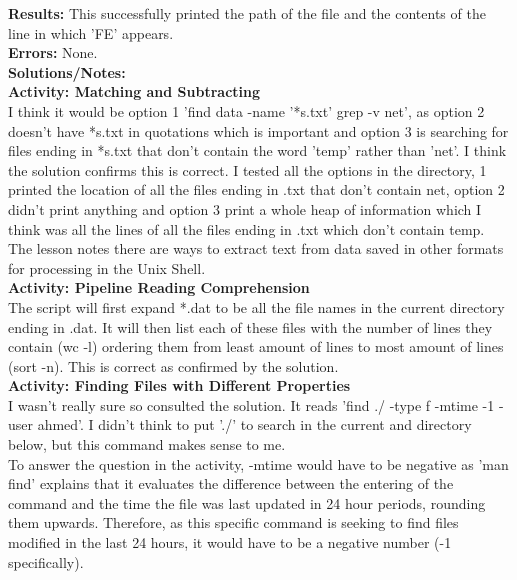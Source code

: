\documentclass{article}
\begin{document}
\begin{FlushLeft}
\textbf{Results:} This successfully printed the path of the file and the contents of the line in which 'FE' appears. \\
\textbf{Errors:} None.\\
\textbf{Solutions/Notes:}\\
\vspace{5mm}
\textbf{Activity: Matching and Subtracting} \\
I think it would be option 1 'find data -name '*s.txt' \textbar{} grep -v net', as option 2 doesn't have *s.txt in quotations which is important and option 3 is searching for files ending in *s.txt that don't contain the word 'temp' rather than 'net'. I think the solution confirms this is correct. I tested all the options in the directory, 1 printed the location of all the files ending in .txt that don't contain net, option 2 didn't print anything and option 3 print a whole heap of information which I think was all the lines of all the files ending in .txt which don't contain temp. \\
\vspace{5mm}
The lesson notes there are ways to extract text from data saved in other formats for processing in the Unix Shell. \\
\vspace{5mm}
\textbf{Activity: Pipeline Reading Comprehension} \\
The script will first expand *.dat to be all the file names in the current directory ending in .dat. It will then list each of these files with the number of lines they contain (wc -l) ordering them from least amount of lines to most amount of lines (sort -n). This is correct as confirmed by the solution.\\
\vspace{5mm}
\textbf{Activity: Finding Files with Different Properties} \\
I wasn't really sure so consulted the solution. It reads 'find ./ -type f -mtime -1 -user ahmed'. I didn't think to put './' to search in the current and directory below, but this command makes sense to me.\\ To answer the question in the activity, -mtime would have to be negative as 'man find' explains that it evaluates the difference between the entering of the command and the time the file was last updated in 24 hour periods, rounding them upwards. Therefore, as this specific command is seeking to find files modified in the last 24 hours, it would have to be a negative number (-1 specifically).\\


\end{FlushLeft}
\end{document}
